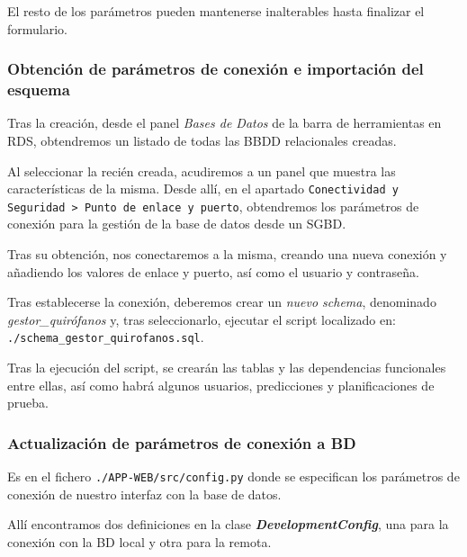 
El resto de los parámetros pueden mantenerse inalterables hasta finalizar el formulario.

\subsubsection{Obtención de parámetros de conexión e importación del esquema}

Tras la creación, desde el panel \textit{Bases de Datos} de la barra de herramientas en RDS, obtendremos un listado de todas las BBDD relacionales creadas.

Al seleccionar la recién creada, acudiremos a un panel que muestra las características de la misma. Desde allí, en el apartado \texttt{Conectividad y Seguridad > Punto de enlace y puerto}, obtendremos los parámetros de conexión para la gestión de la base de datos desde un SGBD.


Tras su obtención, nos conectaremos a la misma, creando una nueva conexión y añadiendo los valores de enlace y puerto, así como el usuario y contraseña.


Tras establecerse la conexión, deberemos crear un \textit{nuevo schema}, denominado \textit{gestor\_quirófanos} y, tras seleccionarlo, ejecutar el script  localizado en:
\texttt{./schema\_gestor\_quirofanos.sql}.

Tras la ejecución del script, se crearán las tablas y las dependencias funcionales entre ellas, así como habrá algunos usuarios, predicciones y planificaciones de prueba.


\subsubsection{Actualización de parámetros de conexión a BD}

Es en el fichero \texttt{./APP-WEB/src/config.py} donde se especifican los parámetros de conexión de nuestro interfaz con la base de datos.

Allí encontramos dos definiciones en la clase \textbf{\textit{DevelopmentConfig}}, una para la conexión con la BD local y otra para la remota.

